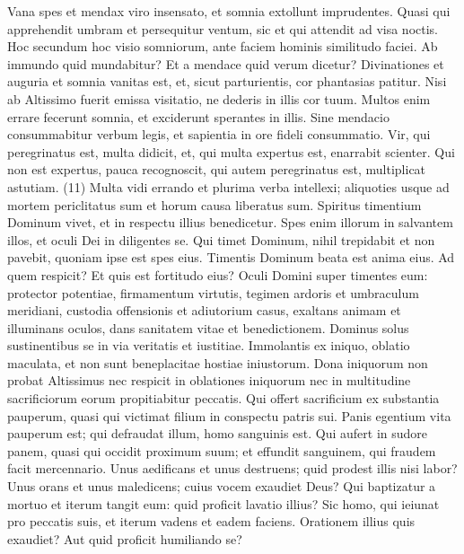 \begin{biblechapter}  
\verse Vana spes et mendax viro insensato, et somnia extollunt imprudentes. 
\verse Quasi qui apprehendit umbram et persequitur ventum, sic et qui attendit ad visa noctis. 
\verse Hoc secundum hoc visio somniorum, ante faciem hominis similitudo faciei. 
\verse Ab immundo quid mundabitur? Et a mendace quid verum dicetur? 
\verse Divinationes et auguria et somnia vanitas est, 
\verse et, sicut parturientis, cor phantasias patitur. Nisi ab Altissimo fuerit emissa visitatio, ne dederis in illis cor tuum. 
\verse Multos enim errare fecerunt somnia, et exciderunt sperantes in illis. 
\verse Sine mendacio consummabitur verbum legis, et sapientia in ore fideli consummatio. 
\verse Vir, qui peregrinatus est, multa didicit, et, qui multa expertus est, enarrabit scienter. 
\verse Qui non est expertus, pauca recognoscit, qui autem peregrinatus est, multiplicat astutiam. (11) 
\verse Multa vidi errando et plurima verba intellexi; 
\verse aliquoties usque ad mortem periclitatus sum et horum causa liberatus sum. 
\verse Spiritus timentium Dominum vivet, et in respectu illius benedicetur. 
\verse Spes enim illorum in salvantem illos, et oculi Dei in diligentes se. 
\verse Qui timet Dominum, nihil trepidabit et non pavebit, quoniam ipse est spes eius. 
\verse Timentis Dominum beata est anima eius. 
\verse Ad quem respicit? Et quis est fortitudo eius? 
\verse Oculi Domini super timentes eum: protector potentiae, firmamentum virtutis, tegimen ardoris et umbraculum meridiani, 
\verse custodia offensionis et adiutorium casus, exaltans animam et illuminans oculos, dans sanitatem vitae et benedictionem. 
\verse Dominus solus sustinentibus se in via veritatis et iustitiae. 
\verse Immolantis ex iniquo, oblatio maculata, et non sunt beneplacitae hostiae iniustorum. 
\verse Dona iniquorum non probat Altissimus nec respicit in oblationes iniquorum nec in multitudine sacrificiorum eorum propitiabitur peccatis. 
\verse Qui offert sacrificium ex substantia pauperum, quasi qui victimat filium in conspectu patris sui. 
\verse Panis egentium vita pauperum est; qui defraudat illum, homo sanguinis est. 
\verse Qui aufert in sudore panem, quasi qui occidit proximum suum; 
\verse et effundit sanguinem, qui fraudem facit mercennario. 
\verse Unus aedificans et unus destruens; quid prodest illis nisi labor? 
\verse Unus orans et unus maledicens; cuius vocem exaudiet Deus? 
\verse Qui baptizatur a mortuo et iterum tangit eum: quid proficit lavatio illius? 
\verse Sic homo, qui ieiunat pro peccatis suis, et iterum vadens et eadem faciens. Orationem illius quis exaudiet? Aut quid proficit humiliando se? 
\end{biblechapter}

